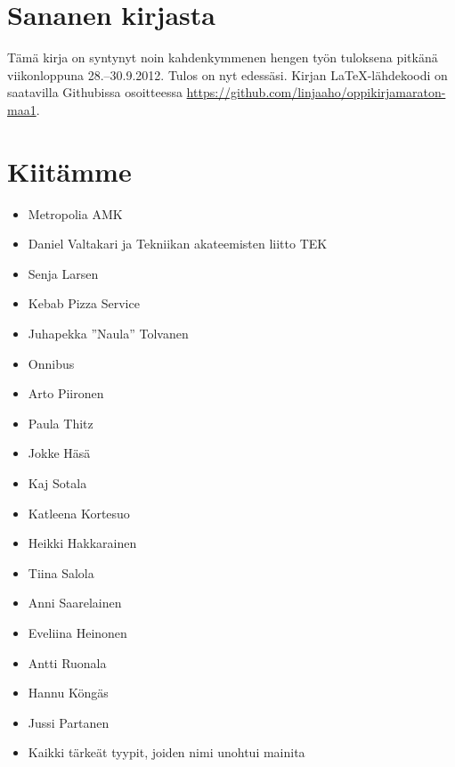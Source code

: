 \section*{Sananen kirjasta}

Tämä kirja on syntynyt noin kahdenkymmenen hengen työn tuloksena pitkänä viikonloppuna 28.--30.9.2012. Tulos on nyt edessäsi. Kirjan \LaTeX-lähdekoodi on saatavilla Githubissa osoitteessa \url{https://github.com/linjaaho/oppikirjamaraton-maa1}.



\section*{Kiitämme}
\begin{itemize}
\item Metropolia AMK
\item Daniel Valtakari ja Tekniikan akateemisten liitto TEK
\item Senja Larsen
\item Kebab Pizza Service
\item Juhapekka ''Naula'' Tolvanen
\item Onnibus
\item Arto Piironen
\item Paula Thitz
\item Jokke Häsä
\item Kaj Sotala
\item Katleena Kortesuo
\item Heikki Hakkarainen
\item Tiina Salola
\item Anni Saarelainen
\item Eveliina Heinonen
\item Antti Ruonala
\item Hannu Köngäs
\item Jussi Partanen
\item Kaikki tärkeät tyypit, joiden nimi unohtui mainita
\end{itemize}


